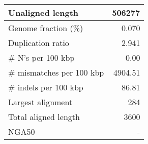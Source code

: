 \documentclass[12pt,a4paper]{article}
\begin{document}
\begin{table}[ht]
\begin{center}
\begin{tabular}{|l*{1}{|r}|}
Unaligned length & 506277 \\ \hline
Genome fraction (\%) & 0.070 \\ \hline
Duplication ratio & 2.941 \\ \hline
\# N's per 100 kbp & 0.00 \\ \hline
\# mismatches per 100 kbp & 4904.51 \\ \hline
\# indels per 100 kbp & 86.81 \\ \hline
Largest alignment & 284 \\ \hline
Total aligned length & 3600 \\ \hline
NGA50 & - \\ \hline
\end{tabular}
\end{center}
\end{table}
\end{document}
